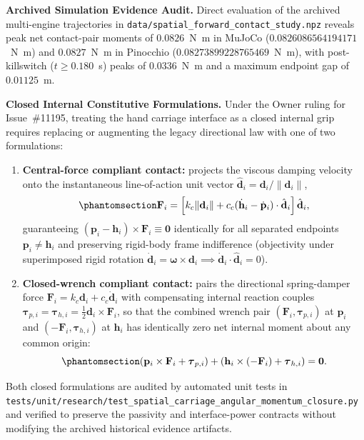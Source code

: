 \documentclass[
  letterpaper,
]{report}
\begin{document}
\noindent\textbf{Archived Simulation Evidence Audit.} Direct evaluation of the archived multi-engine trajectories in \texttt{data/spatial\_forward\_contact\_study.npz} reveals peak net contact-pair moments of \(0.0826\)~N~m in MuJoCo (\(0.0826086564194171\)~N~m) and \(0.0827\)~N~m in Pinocchio (\(0.08273899228765469\)~N~m), with post-killswitch (\(t \ge 0.180\)~s) peaks of \(0.0336\)~N~m and a maximum endpoint gap of \(0.01125\)~m.

\noindent\textbf{Closed Internal Constitutive Formulations.} Under the Owner ruling for Issue~\#11195, treating the hand carriage interface as a closed internal grip requires replacing or augmenting the legacy directional law with one of two formulations:
\begin{enumerate}
\def\labelenumi{\arabic{enumi}.}
\item \textbf{Central-force compliant contact:} projects the viscous damping velocity onto the instantaneous line-of-action unit vector \(\hat{\mathbf d}_i = \mathbf d_i / \lVert\mathbf d_i\rVert\),
\begin{equation}\phantomsection\label{eq-spatial-carriage-central-force}{
\mathbf F_i = \left[k_c \lVert\mathbf d_i\rVert + c_c (\dot{\mathbf h}_i - \dot{\mathbf p}_i)\cdot \hat{\mathbf d}_i\right]\hat{\mathbf d}_i,
}\end{equation}
guaranteeing \((\mathbf p_i - \mathbf h_i)\times \mathbf F_i \equiv \mathbf 0\) identically for all separated endpoints \(\mathbf p_i \neq \mathbf h_i\) and preserving rigid-body frame indifference (objectivity under superimposed rigid rotation \(\dot{\mathbf d}_i = \boldsymbol\omega \times \mathbf d_i \implies \dot{\mathbf d}_i \cdot \hat{\mathbf d}_i = 0\)).
\item \textbf{Closed-wrench compliant contact:} pairs the directional spring-damper force \(\mathbf F_i = k_c \mathbf d_i + c_c \dot{\mathbf d}_i\) with compensating internal reaction couples \(\boldsymbol\tau_{p,i} = \boldsymbol\tau_{h,i} = \frac{1}{2}\mathbf d_i \times \mathbf F_i\), so that the combined wrench pair \((\mathbf F_i, \boldsymbol\tau_{p,i})\) at \(\mathbf p_i\) and \((-\mathbf F_i, \boldsymbol\tau_{h,i})\) at \(\mathbf h_i\) has identically zero net internal moment about any common origin:
\begin{equation}\phantomsection\label{eq-spatial-carriage-closed-wrench}{
(\mathbf p_i \times \mathbf F_i + \boldsymbol\tau_{p,i}) + (\mathbf h_i \times (-\mathbf F_i) + \boldsymbol\tau_{h,i}) = \mathbf 0.
}\end{equation}
\end{enumerate}
Both closed formulations are audited by automated unit tests in \texttt{tests/unit/research/test\_spatial\_carriage\_angular\_momentum\_closure.py} and verified to preserve the passivity and interface-power contracts without modifying the archived historical evidence artifacts.
\end{document}
